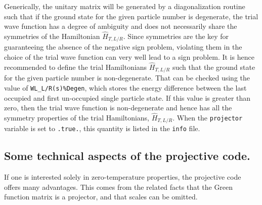 Generically,   the  unitary matrix    will  be generated by a
diagonalization routine such that  if the ground state for the given particle number is degenerate, the trial wave function  has a degree of ambiguity  and does not necessarily share the symmetries of the Hamiltonian $\hat{H}_{T, L/R}$.   Since symmetries are the key for guaranteeing the absence of the negative sign problem, violating them in the choice of the trial wave function can very well lead to a  sign problem.   It is hence recommended to define the trial Hamiltonians $\hat{H}_{T, L/R}$ such that the ground state  for the given  particle number is non-degenerate. That can be checked using the value of \texttt{WL\_L/R(s)\%Degen}, which stores the energy difference between the last occupied and first un-occupied single particle state. If this value is greater than zero, then the trial wave function is non-degenerate and hence has all the symmetry properties of the trial Hamiltonians, $\hat{H}_{T, L/R}$. When the \texttt{projector} variable is set to \texttt{.true.}, this quantity is listed in the \texttt{info} file. 

\subsection{Some technical aspects of the projective code.}
If one is interested solely in zero-temperature properties, the projective code offers many advantages.  This comes from the related facts that the Green function matrix is a projector, and that scales can be omitted. 
  
